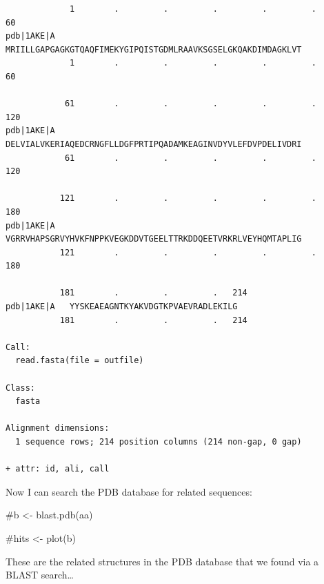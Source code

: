 \documentclass[
  letterpaper,
  DIV=11,
  numbers=noendperiod]{scrartcl}
\newenvironment{Shaded}{\begin{snugshade}}{\end{snugshade}}
\newcommand{\CommentTok}[1]{\textcolor[rgb]{0.37,0.37,0.37}{#1}}
\begin{document}
\begin{verbatim}
             1        .         .         .         .         .         60 
pdb|1AKE|A   MRIILLGAPGAGKGTQAQFIMEKYGIPQISTGDMLRAAVKSGSELGKQAKDIMDAGKLVT
             1        .         .         .         .         .         60 

            61        .         .         .         .         .         120 
pdb|1AKE|A   DELVIALVKERIAQEDCRNGFLLDGFPRTIPQADAMKEAGINVDYVLEFDVPDELIVDRI
            61        .         .         .         .         .         120 

           121        .         .         .         .         .         180 
pdb|1AKE|A   VGRRVHAPSGRVYHVKFNPPKVEGKDDVTGEELTTRKDDQEETVRKRLVEYHQMTAPLIG
           121        .         .         .         .         .         180 

           181        .         .         .   214 
pdb|1AKE|A   YYSKEAEAGNTKYAKVDGTKPVAEVRADLEKILG
           181        .         .         .   214 

Call:
  read.fasta(file = outfile)

Class:
  fasta

Alignment dimensions:
  1 sequence rows; 214 position columns (214 non-gap, 0 gap) 

+ attr: id, ali, call
\end{verbatim}

Now I can search the PDB database for related sequences:

\begin{Shaded}
\begin{Highlighting}[]
\CommentTok{\#b \textless{}{-} blast.pdb(aa)}
\end{Highlighting}
\end{Shaded}

\begin{Shaded}
\begin{Highlighting}[]
\CommentTok{\#hits \textless{}{-} plot(b)}
\end{Highlighting}
\end{Shaded}

\begin{Shaded}
\end{Shaded}

These are the related structures in the PDB database that we found via a
BLAST search\ldots{}
\end{document}
